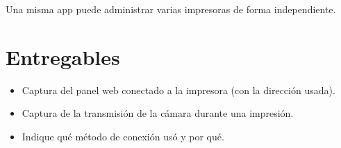 Una misma app puede administrar varias impresoras de forma independiente.

\section{Entregables}

\begin{entregabox}
\begin{itemize}
    \item Captura del panel web conectado a la impresora (con la dirección usada).
    \item Captura de la transmisión de la cámara durante una impresión.
    \item Indique qué método de conexión usó y por qué.
\end{itemize}
\end{entregabox}
